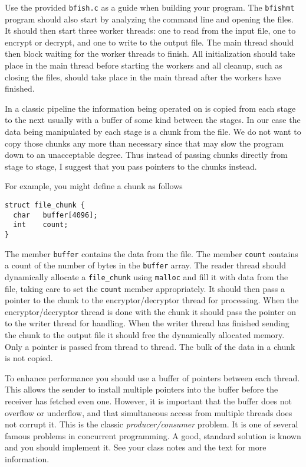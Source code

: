\documentclass[twocolumn]{article}
\newcommand{\code}[1]{\texttt{#1}}
\newcommand{\filename}[1]{\texttt{#1}}
\newcommand{\newterm}[1]{\textit{#1}}
\begin{document}
Use the provided \filename{bfish.c} as a guide when building your program. The
\filename{bfishmt} program should also start by analyzing the command line and opening the
files. It should then start three worker threads: one to read from the input file, one to
encrypt or decrypt, and one to write to the output file. The main thread should then block
waiting for the worker threads to finish. All initialization should take place in the main
thread before starting the workers and all cleanup, such as closing the files, should take place
in the main thread after the workers have finished.

In a classic pipeline the information being operated on is copied from each stage to the next
usually with a buffer of some kind between the stages. In our case the data being manipulated by
each stage is a chunk from the file. We do not want to copy those chunks any more than necessary
since that may slow the program down to an unacceptable degree. Thus instead of passing chunks
directly from stage to stage, I suggest that you pass pointers to the chunks instead.

For example, you might define a chunk as follows

\begin{verbatim}
struct file_chunk {
  char   buffer[4096];
  int    count;
}
\end{verbatim}

The member \code{buffer} contains the data from the file. The member \code{count} contains a
count of the number of bytes in the \code{buffer} array. The reader thread should dynamically
allocate a \code{file\_chunk} using \code{malloc} and fill it with data from the file, taking
care to set the \code{count} member appropriately. It should then pass a pointer to the chunk to
the encryptor/decryptor thread for processing. When the encryptor/decryptor thread is done with
the chunk it should pass the pointer on to the writer thread for handling. When the writer
thread has finished sending the chunk to the output file it should free the dynamically
allocated memory. Only a pointer is passed from thread to thread. The bulk of the data in a
chunk is not copied.

To enhance performance you should use a buffer of pointers between each thread. This allows the
sender to install multiple pointers into the buffer before the receiver has fetched even one.
However, it is important that the buffer does not overflow or underflow, and that simultaneous
access from multiple threads does not corrupt it. This is the classic
\newterm{producer/consumer} problem. It is one of several famous problems in concurrent
programming. A good, standard solution is known and you should implement it. See your class
notes and the text for more information.
\end{document}
